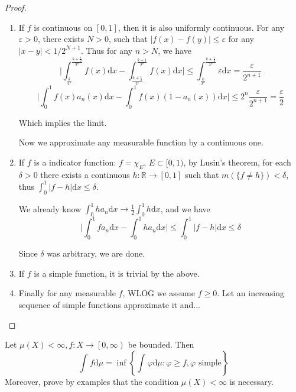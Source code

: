 \begin{proof}
	\begin{enumerate}
		\item If $ f $ is continuous on $ [0,1] $, then it is also uniformly continuous. For any $ \varepsilon>0 $, there exists $ N>0 $, such that $ \vert f(x)-f(y) \vert \le \varepsilon $ for any $ \vert x-y \vert<1/{2^{N+1}} $. Thus for any $ n>N $, we have
		      $$
			      \bigg| \int_{\frac{k}{2^n}}^{\frac{k+\frac{1}{2}}{2^n}}{f( x ) \mathrm{d} x}-\int_{\frac{k+\frac{1}{2}}{2^n}}^{\frac{k+1}{2^n}}{f( x ) \mathrm{d} x} \bigg|\le \int_{\frac{k}{2^n}}^{\frac{k+\frac{1}{2}}{2^n}}{\varepsilon \mathrm{d} x}=\frac{\varepsilon}{2^{n+1}}
		      $$
		      $$
			      \bigg|\int_0^1{f( x ) a_n( x ) \mathrm{d} x}-\int_0^1{f( x ) ( 1-a_n( x ) ) \mathrm{d} x}\bigg|\le 2^n\frac{\varepsilon}{2^{n+1}}=\frac{\varepsilon}{2}
		      $$

		      Which implies the limit.

		      Now we approximate any measurable function by a continuous one.
		\item If $ f $ is a indicator function: $ f=\chi_{E} $, $ E\subset [ 0,1) $, by Lusin's theorem, for each $ \delta>0 $ there exists a continuous $ h\colon\mathbb{R} \to [0,1]  $ such that $ m(\{f\ne h\})<\delta $, thus $ \int_{0}^{1}\vert f-h \vert\mathrm{d}x\le \delta $.

		      We already know $
			      \int_0^1{ha_n\mathrm{d} x}\rightarrow \frac{1}{2}\int_0^1{h\mathrm{d} x}
		      $, and we have
		      $$
			      \bigg|\int_0^1{fa_n\mathrm{d} x}-\int_0^1{ha_n\mathrm{d} x}\bigg|\le \int_0^1{\vert f-h \vert\mathrm{d} x}\le \delta
		      $$

		      Since $ \delta $ was arbitrary, we are done.

		\item If $ f $ is a simple function, it is trivial by the above.

		\item Finally for any measurable $ f $, WLOG we assume $ f\ge 0 $. Let an increasing sequence of simple functions approximate it and...
	\end{enumerate}
\end{proof}

\begin{problem}
Let $ \mu(X)<\infty,f\colon X \to \left[0 ,\infty \right) $ be bounded. Then
$$
	\int_{}^{}{f\mathrm{d}\mu}=\inf\left\{ \int_{}^{}{\varphi \mathrm{d}\mu}:\varphi \ge f, \varphi \text{ simple} \right\}
$$
Moreover, prove by examples that the condition $ \mu(X)<\infty  $ is necessary.
\end{problem}

